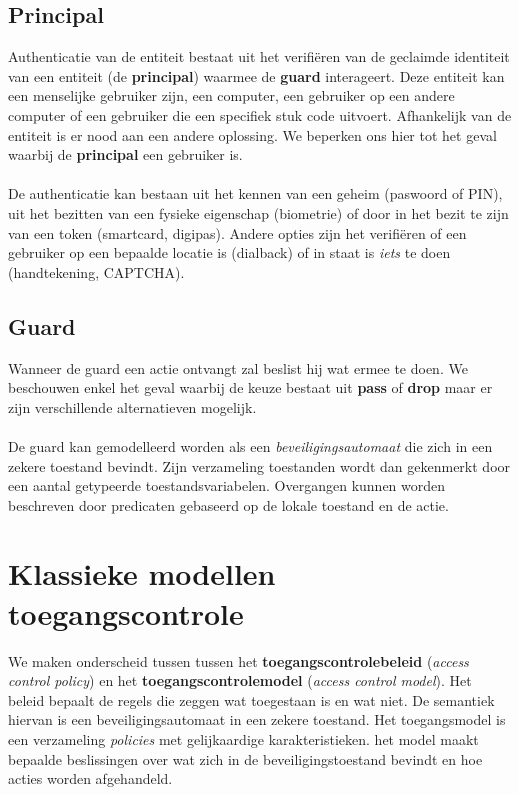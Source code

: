 \documentclass[../main.tex]{subfiles}
\begin{document}
\subsection{Principal}
Authenticatie van de entiteit bestaat uit het verifi\"eren van de geclaimde identiteit van een entiteit (de \textbf{principal}) waarmee de \textbf{guard} interageert. Deze entiteit kan een menselijke gebruiker zijn, een computer, een gebruiker op een andere computer of een gebruiker die een specifiek stuk code uitvoert. Afhankelijk van de entiteit is er nood aan een andere oplossing. We beperken ons hier tot het geval waarbij de \textbf{principal} een gebruiker is.
\\\\
De authenticatie kan bestaan uit het kennen van een geheim (paswoord of PIN), uit het bezitten van een fysieke eigenschap (biometrie) of door in het bezit te zijn van een token (smartcard, digipas). Andere opties zijn het verifi\"eren of een gebruiker op een bepaalde locatie is (dialback) of in staat is \textit{iets} te doen (handtekening, CAPTCHA).

\subsection{Guard}
Wanneer de guard een actie ontvangt zal beslist hij wat ermee te doen. We beschouwen enkel het geval waarbij de keuze bestaat uit \textbf{pass} of \textbf{drop} maar er zijn verschillende alternatieven mogelijk. 
\\\\
De guard kan gemodelleerd worden als een \textit{beveiligingsautomaat} die zich in een zekere toestand bevindt. Zijn verzameling toestanden wordt dan gekenmerkt door een aantal getypeerde toestandsvariabelen. Overgangen kunnen worden beschreven door predicaten gebaseerd op de lokale toestand en de actie.


\section{Klassieke modellen toegangscontrole}
We maken onderscheid tussen tussen het \textbf{toegangscontrolebeleid} (\textit{access control policy}) en het \textbf{toegangscontrolemodel} (\textit{access control model}). Het beleid bepaalt de regels die zeggen wat toegestaan is en wat niet. De semantiek hiervan is een beveiligingsautomaat in een zekere toestand. Het toegangsmodel is een verzameling \textit{policies} met gelijkaardige karakteristieken. het model maakt bepaalde beslissingen over wat zich in de beveiligingstoestand bevindt en hoe acties worden afgehandeld. 
\end{document}
